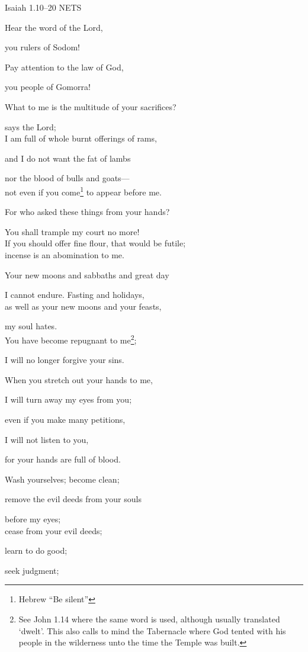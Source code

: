 \documentclass[
]{article}
\begin{document}
Isaiah 1.10--20 NETS

Hear the word of the Lord,

you rulers of Sodom!

Pay attention to the law of God,

you people of Gomorra!

What to me is the multitude of your sacrifices?

says the Lord;\\
I am full of whole burnt offerings of rams,

and I do not want the fat of lambs

nor the blood of bulls and goats---\\
not even if you come\footnote{Hebrew ``Be silent''} to appear before me.

For who asked these things from your hands?

You shall trample my court no more!\\
If you should offer fine flour, that would be futile;\\
incense is an abomination to me.

Your new moons and sabbaths and great day

I cannot endure. Fasting and holidays,\\
as well as your new moons and your feasts,

my soul hates.\\
You have become repugnant to me\footnote{See John 1.14 where the same
  word is used, although usually translated `dwelt'. This also calls to
  mind the Tabernacle where God tented with his people in the wilderness
  unto the time the Temple was built.};

I will no longer forgive your sins.

When you stretch out your hands to me,

I will turn away my eyes from you;

even if you make many petitions,

I will not listen to you,

for your hands are full of blood.

Wash yourselves; become clean;

remove the evil deeds from your souls

before my eyes;\\
cease from your evil deeds;

learn to do good;

seek judgment;
\end{document}
